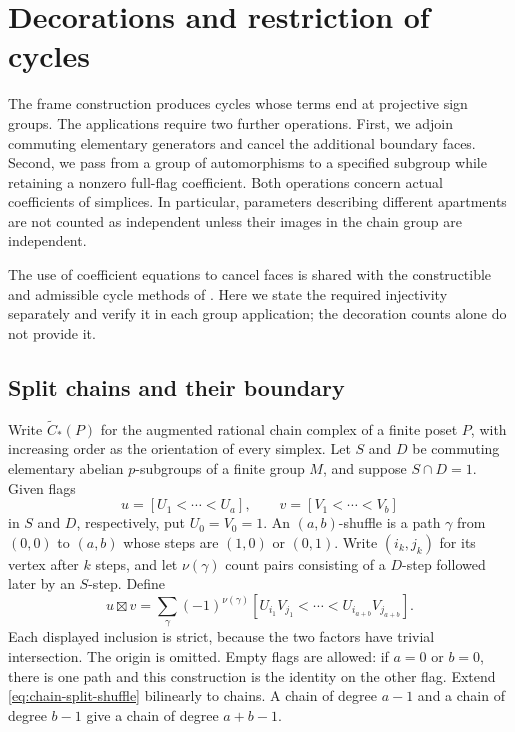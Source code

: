 \section{Decorations and restriction of cycles}\label{sec:chains}

The frame construction produces cycles whose terms end at projective
sign groups. The applications require two further operations. First,
we adjoin commuting elementary generators and cancel the additional
boundary faces. Second, we pass from a group of automorphisms to a
specified subgroup while retaining a nonzero full-flag coefficient.
Both operations concern actual coefficients of simplices. In
particular, parameters describing different apartments are not counted
as independent unless their images in the chain group are independent.

The use of coefficient equations to cancel faces is shared with the
constructible and admissible cycle methods of
\citet{DiazRamos2018,DiazRamosMazza2022}. Here we state the required
injectivity separately and verify it in each group application; the
decoration counts alone do not provide it.

\subsection{Split chains and their boundary}

Write $\widetilde C_*(P)$ for the augmented rational chain complex of
a finite poset $P$, with increasing order as the orientation of every
simplex. Let $S$ and $D$ be commuting elementary abelian $p$-subgroups
of a finite group $M$, and suppose $S\cap D=1$. Given flags
\[
 u=[U_1<\cdots<U_a],\qquad
 v=[V_1<\cdots<V_b]
\]
in $S$ and $D$, respectively, put $U_0=V_0=1$. An $(a,b)$-shuffle
is a path $\gamma$ from $(0,0)$ to $(a,b)$ whose steps are $(1,0)$
or $(0,1)$. Write $(i_k,j_k)$ for its vertex after $k$ steps, and
let $\nu(\gamma)$ count pairs consisting of a $D$-step followed
later by an $S$-step. Define
\begin{equation}\label{eq:chain-split-shuffle}
 u\boxtimes v
 =\sum_{\gamma}(-1)^{\nu(\gamma)}
 [U_{i_1}V_{j_1}<\cdots<U_{i_{a+b}}V_{j_{a+b}}].
\end{equation}
Each displayed inclusion is strict, because the two factors have
trivial intersection. The origin is omitted. Empty flags are allowed:
if $a=0$ or $b=0$, there is one path and this construction is the
identity on the other flag. Extend \eqref{eq:chain-split-shuffle}
bilinearly to chains. A chain of degree $a-1$ and a chain of degree
$b-1$ give a chain of degree $a+b-1$.

